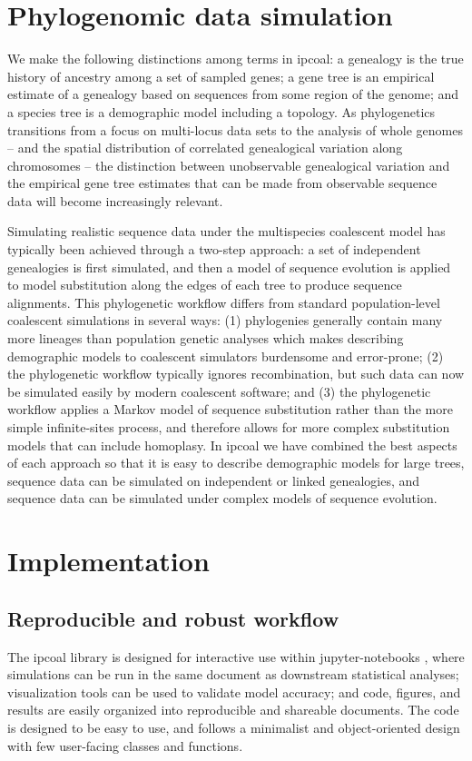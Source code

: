 \documentclass[11pt]{article}
\begin{document}
\section{Phylogenomic data simulation}
We make the following distinctions among terms in ipcoal: a genealogy is the true history of ancestry among a set of sampled genes; a gene tree is an empirical estimate of a genealogy based on sequences from some region of the genome; and a species tree is a demographic model including a topology. As phylogenetics transitions from a focus on multi-locus data sets \cite{knowles_estimating_2011} to the analysis of whole genomes -- and the spatial distribution of correlated genealogical variation along chromosomes -- the distinction between unobservable genealogical variation and the empirical gene tree estimates that can be made from observable sequence data will become increasingly relevant. 

Simulating realistic sequence data under the multispecies coalescent model has typically been achieved through a two-step approach: a set of independent genealogies is first simulated, and then a model of sequence evolution is applied to model substitution along the edges of each tree to produce sequence alignments. This phylogenetic workflow differs from standard population-level coalescent simulations in several ways: (1) phylogenies generally contain many more lineages than population genetic analyses which makes describing demographic models to coalescent simulators burdensome and error-prone; (2) the phylogenetic workflow typically ignores recombination, but such data can now be simulated easily by modern coalescent software; and (3) the phylogenetic workflow applies a Markov model of sequence substitution rather than the more simple infinite-sites process, and therefore allows for more complex substitution models that can include homoplasy. In ipcoal we have combined the best aspects of each approach so that it is easy to describe demographic models for large trees, sequence data can be simulated on independent or linked genealogies, and sequence data can be simulated under complex models of sequence evolution. 

\section{Implementation}
\label{sec:headings}
\subsection{Reproducible and robust workflow}
The ipcoal library is designed for interactive use within jupyter-notebooks \cite{kluyver_jupyter_2016}, where simulations can be run in the same document as downstream statistical analyses; visualization tools can be used to validate model accuracy; and code, figures, and results are easily organized into reproducible and shareable documents. The code is designed to be easy to use, and follows a minimalist and object-oriented design with few user-facing classes and functions.
\end{document}
